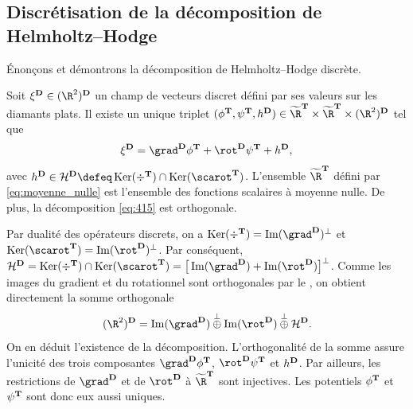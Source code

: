 \subsection{Discrétisation de la décomposition de Helmholtz--Hodge}

Énonçons et démontrons la décomposition de Helmholtz--Hodge discrète.
\begin{theo} \label{theo:dhhd}
Soit $\xi^\ensdiamantplat \in (\R^2)^\ensdiamantplat$ un champ de vecteurs discret défini par ses valeurs sur les diamants plats. Il existe un unique triplet $(\phi^\ensddfvplat, \psi^\ensddfvplat, h^\ensdiamantplat) \in \Rddfvmn \times \Rddfvmn \times (\R^2)^\ensdiamantplat$ tel que
\begin{equation} \label{eq:415}
    \xi^\ensdiamantplat = \grad^\ensdiamantplat \phi^\ensddfvplat + \rot^\ensdiamantplat \psi^\ensddfvplat + h^\ensdiamantplat,
\end{equation}
avec $h^\ensdiamantplat \in \mathcal{H}^\ensdiamantplat \defeq \Ker(\div^\ensddfvplat) \cap \Ker(\scarot^\ensddfvplat)$. L'ensemble $\Rddfvmn$ défini par \ref{eq:moyenne_nulle} est l'ensemble des fonctions scalaires \ddfv à moyenne nulle. De plus, la décomposition \ref{eq:415} est orthogonale.
\end{theo}

\begin{demo}
Par dualité des opérateurs discrets, on a $\Ker(\div^\ensddfvplat) = \Image(\grad^\ensdiamantplat)^\perp$ et $\Ker(\scarot^\ensddfvplat) = \Image(\rot^\ensdiamantplat)^\perp$. Par conséquent, $\mathcal{H}^\ensdiamantplat = \Ker(\div^\ensddfvplat) \cap \Ker(\scarot^\ensddfvplat) = \big[\Image(\grad^\ensdiamantplat) + \Image(\rot^\ensdiamantplat) \big]^\perp$. Comme les images du gradient et du rotationnel sont orthogonales par le , on obtient directement la somme orthogonale
\[
(\R^2)^\ensdiamantplat
=
\Image(\grad^\ensdiamantplat) \oplusperp \Image(\rot^\ensdiamantplat) \oplusperp \mathcal{H}^\ensdiamantplat.
\]
On en déduit l’existence de la décomposition. L’orthogonalité de la somme assure l’unicité des trois composantes $\grad^\ensdiamantplat \phi^\ensddfvplat$, $\rot^\ensdiamantplat \psi^\ensddfvplat$ et $h^{\mathbf{D}}$. Par ailleurs, les restrictions de $\grad^\ensdiamantplat$ et de $\rot^\ensdiamantplat$ à $\Rddfvmn$ sont injectives. Les potentiels $\phi^{\mathbf{T}}$ et $\psi^{\mathbf{T}}$ sont donc eux aussi uniques.
\end{demo}

